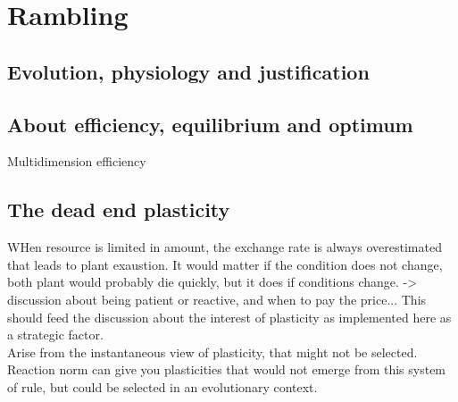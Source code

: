 \part{Rambling}


\chapter{Evolution, physiology and justification}

\chapter{About efficiency, equilibrium and optimum}

Multidimension efficiency 

\chapter{The dead end plasticity}

WHen resource is limited in amount, the exchange rate is always overestimated that leads to plant exaustion. It would matter if the condition does not change, both plant would probably die quickly, but it does if conditions change. -> discussion about being patient or reactive, and when to pay the price... This should feed the discussion about the interest of plasticity as implemented here as a strategic factor.\\
Arise from the instantaneous view of plasticity, that might not be selected. Reaction norm can give you plasticities that would not emerge from this system of rule, but could be selected in an evolutionary context.